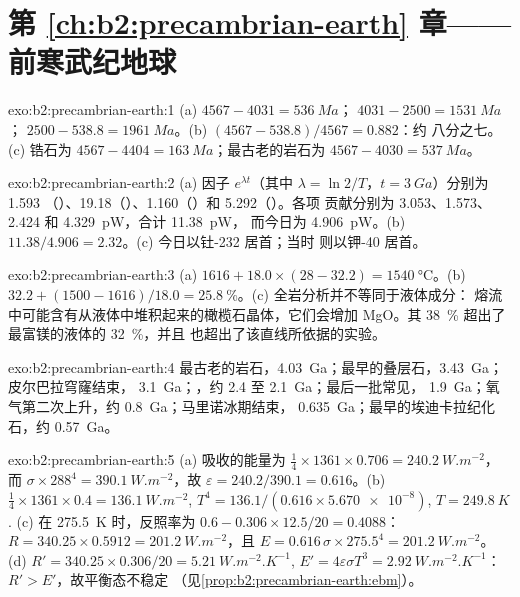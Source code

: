 \section*{第 \ref{ch:b2:precambrian-earth} 章——前寒武纪地球}

\begin{solution}{exo:b2:precambrian-earth:1}
(a)  $4567 - 4031 = \qty{536}{Ma}$； $4031 - 2500 = \qty{1531}{Ma}$；
 $2500 - 538.8 = \qty{1961}{Ma}$。(b) $(4567 - 538.8)/4567 = 0.882$：约
八分之七。(c) 锆石为 $4567 - 4404 = \qty{163}{Ma}$；最古老的岩石为
$4567 - 4030 = \qty{537}{Ma}$。
\end{solution}

\begin{solution}{exo:b2:precambrian-earth:2}
(a) 因子 $e^{\lambda t}$（其中 $\lambda = \ln2/T$，$t = \qty{3}{Ga}$）分别为 1.593
（）、19.18（）、1.160（）和 5.292（）。各项
贡献分别为 3.053、1.573、2.424 和 \qty{4.329}{pW}，合计 \qty{11.38}{pW}，
而今日为 \qty{4.906}{pW}。(b) $11.38/4.906 = 2.32$。(c) 今日以钍-232 居首；当时
则以钾-40 居首。
\end{solution}

\begin{solution}{exo:b2:precambrian-earth:3}
(a) $1616 + 18.0\times(28 - 32.2) = \qty{1540}{\celsius}$。(b) $32.2 + (1500 - 1616)/18.0 =
\qty{25.8}{\percent}$。(c) 全岩分析并不等同于液体成分：
熔流中可能含有从液体中堆积起来的橄榄石晶体，它们会增加 MgO。其
\qty{38}{\percent} 超出了最富镁的液体的 \qty{32}{\percent}，并且
也超出了该直线所依据的实验。
\end{solution}

\begin{solution}{exo:b2:precambrian-earth:4}
最古老的岩石，\qty{4.03}{Ga}；最早的叠层石，\qty{3.43}{Ga}；皮尔巴拉穹窿结束，
\qty{3.1}{Ga}；，约 2.4 至 \qty{2.1}{Ga}；最后一批常见，
\qty{1.9}{Ga}；氧气第二次上升，约 \qty{0.8}{Ga}；马里诺冰期结束，
\qty{0.635}{Ga}；最早的埃迪卡拉纪化石，约 \qty{0.57}{Ga}。
\end{solution}

\begin{solution}{exo:b2:precambrian-earth:5}
(a) 吸收的能量为 $\tfrac14\times1361\times0.706 = \qty{240.2}{W.m^{-2}}$，而 $\sigma\times288^4 =
\qty{390.1}{W.m^{-2}}$，故 $\varepsilon = 240.2/390.1 = 0.616$。(b) $\tfrac14\times1361\times0.4
= \qty{136.1}{W.m^{-2}}$, $T^4 = 136.1/(0.616\times\num{5.670e-8})$, $T = \qty{249.8}{K}$.
(c) 在 \qty{275.5}{K} 时，反照率为 $0.6 - 0.306\times12.5/20 = 0.4088$：$R = 340.25\times0.5912 =
\qty{201.2}{W.m^{-2}}$，且 $E = 0.616\,\sigma\times275.5^4 = \qty{201.2}{W.m^{-2}}$。(d) $R' =
340.25\times0.306/20 = \qty{5.21}{W.m^{-2}.K^{-1}}$, $E' = 4\varepsilon\sigma T^3 =
\qty{2.92}{W.m^{-2}.K^{-1}}$：$R' > E'$，故平衡态不稳定
（见\cref{prop:b2:precambrian-earth:ebm}）。
\end{solution}


